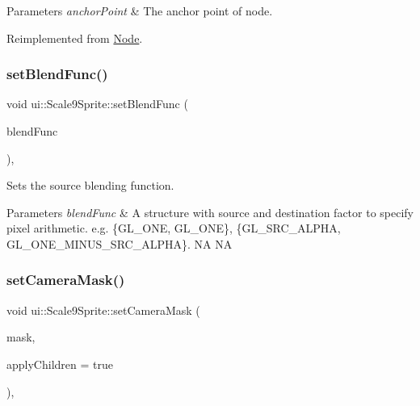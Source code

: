 \begin{DoxyParams}{Parameters}
{\em anchor\+Point} & The anchor point of node. \\
\hline
\end{DoxyParams}


Reimplemented from \hyperlink{classNode_a4dd45cb48a51df7c257675f527e3f277}{Node}.

\mbox{\label{classui_1_1Scale9Sprite_a23f274883a4d7ce548f2f0cbd94d33d5}} 
\subsubsection{\texorpdfstring{set\+Blend\+Func()}{setBlendFunc()}}
{\footnotesize\ttfamily void ui\+::\+Scale9\+Sprite\+::set\+Blend\+Func (\begin{DoxyParamCaption}\item[{const \hyperlink{structBlendFunc}{Blend\+Func} \&}]{blend\+Func }\end{DoxyParamCaption})\hspace{0.3cm}{\ttfamily [override]}, {\ttfamily [virtual]}}

Sets the source blending function.


\begin{DoxyParams}{Parameters}
{\em blend\+Func} & A structure with source and destination factor to specify pixel arithmetic. e.\+g. \{G\+L\+\_\+\+O\+NE, G\+L\+\_\+\+O\+NE\}, \{G\+L\+\_\+\+S\+R\+C\+\_\+\+A\+L\+P\+HA, G\+L\+\_\+\+O\+N\+E\+\_\+\+M\+I\+N\+U\+S\+\_\+\+S\+R\+C\+\_\+\+A\+L\+P\+HA\}.  NA  NA \\
\hline
\end{DoxyParams}
\mbox{\label{classui_1_1Scale9Sprite_ab871c3756134c9f991876cd78ae1ef03}} 
\subsubsection{\texorpdfstring{set\+Camera\+Mask()}{setCameraMask()}}
{\footnotesize\ttfamily void ui\+::\+Scale9\+Sprite\+::set\+Camera\+Mask (\begin{DoxyParamCaption}\item[{unsigned short}]{mask,  }\item[{bool}]{apply\+Children = {\ttfamily true} }\end{DoxyParamCaption})\hspace{0.3cm}{\ttfamily [override]}, {\ttfamily [virtual]}}


